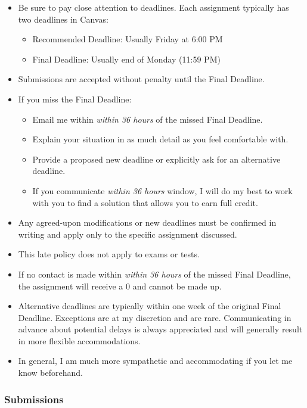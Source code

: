 \documentclass[
]{book}
\providecommand{\tightlist}{%
  \setlength{\itemsep}{0pt}\setlength{\parskip}{0pt}}
\begin{document}
\begin{itemize}
\tightlist
\item
  Be sure to pay close attention to deadlines. Each assignment typically has two deadlines in Canvas:

  \begin{itemize}
  \tightlist
  \item
    Recommended Deadline: Usually Friday at 6:00 PM
  \item
    Final Deadline: Usually end of Monday (11:59 PM)
  \end{itemize}
\item
  Submissions are accepted without penalty until the Final Deadline.
\item
  If you miss the Final Deadline:

  \begin{itemize}
  \tightlist
  \item
    Email me within \emph{within 36 hours} of the missed Final Deadline.
  \item
    Explain your situation in as much detail as you feel comfortable with.
  \item
    Provide a proposed new deadline or explicitly ask for an alternative deadline.
  \item
    If you communicate \emph{within 36 hours} window, I will do my best to work with you to find a solution that allows you to earn full credit.
  \end{itemize}
\item
  Any agreed-upon modifications or new deadlines must be confirmed in writing and apply only to the specific assignment discussed.
\item
  This late policy does not apply to exams or tests.
\item
  If no contact is made within \emph{within 36 hours} of the missed Final Deadline, the assignment will receive a 0 and cannot be made up.
\item
  Alternative deadlines are typically within one week of the original Final Deadline. Exceptions are at my discretion and are rare.
  Communicating in advance about potential delays is always appreciated and will generally result in more flexible accommodations.
\item
  In general, I am much more sympathetic and accommodating if you let me know beforehand.
\end{itemize}

\subsubsection{Submissions}\label{submissions}
\end{document}
